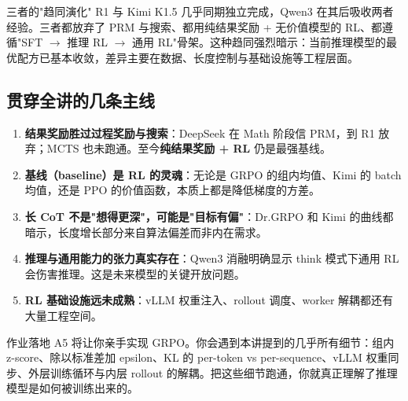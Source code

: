 \documentclass[a4paper]{article}
\begin{document}
\begin{knowledgebox}{三者的"趋同演化"}
R1 与 Kimi K1.5 几乎同期独立完成，Qwen3 在其后吸收两者经验。三者都放弃了 PRM 与搜索、都用纯结果奖励 + 无价值模型的 RL、都遵循"SFT $\to$ 推理 RL $\to$ 通用 RL"骨架。这种趋同强烈暗示：当前推理模型的最优配方已基本收敛，差异主要在数据、长度控制与基础设施等工程层面。
\end{knowledgebox}

\subsection{贯穿全讲的几条主线}

\begin{enumerate}
\item \textbf{结果奖励胜过过程奖励与搜索}：DeepSeek 在 Math 阶段信 PRM，到 R1 放弃；MCTS 也未跑通。至今\textbf{纯结果奖励 + RL} 仍是最强基线。
\item \textbf{基线（baseline）是 RL 的灵魂}：无论是 GRPO 的组内均值、Kimi 的 batch 均值，还是 PPO 的价值函数，本质上都是降低梯度的方差。
\item \textbf{长 CoT 不是"想得更深"，可能是"目标有偏"}：Dr.GRPO 和 Kimi 的曲线都暗示，长度增长部分来自算法偏差而非内在需求。
\item \textbf{推理与通用能力的张力真实存在}：Qwen3 消融明确显示 think 模式下通用 RL 会伤害推理。这是未来模型的关键开放问题。
\item \textbf{RL 基础设施远未成熟}：vLLM 权重注入、rollout 调度、worker 解耦都还有大量工程空间。
\end{enumerate}

\begin{practicebox}{作业落地}
A5 将让你亲手实现 GRPO。你会遇到本讲提到的几乎所有细节：组内 z-score、除以标准差加 epsilon、KL 的 per-token vs per-sequence、vLLM 权重同步、外层训练循环与内层 rollout 的解耦。把这些细节跑通，你就真正理解了推理模型是如何被训练出来的。
\end{practicebox}
\end{document}
